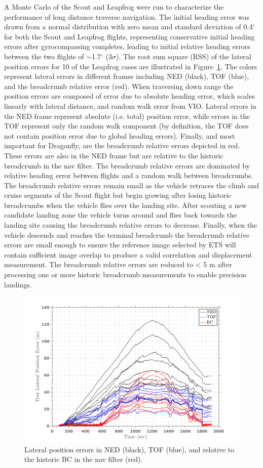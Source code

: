 A Monte Carlo of the Scout and Leapfrog were run to characterize the performance of long distance traverse navigation. The initial heading error was drawn from a normal distribution with zero mean and standard deviation of 0.4$^\circ$ for both the Scout and Leapfrog flights, representing conservative initial heading errors after gyrocompassing completes, leading to initial relative heading errors between the two flights of $\sim$1.7$^\circ$ (3$\sigma$). The root sum square (RSS) of the lateral position errors for 10 of the Leapfrog cases are illustrated in Figure~\ref{fig:leapfrog}. The colors represent lateral errors in different frames including NED (black), TOF (blue), and the breadcrumb relative error (red). When traversing down range the position errors are composed of error due to absolute heading error, which scales linearly with lateral distance, and random walk error from \ac{VIO}. Lateral errors in the NED frame represent absolute (i.e. total) position error, while errors in the TOF represent only the random walk component (by definition, the TOF does not contain position error due to global heading errors). Finally, and most important for Dragonfly, are the breadcrumb relative errors depicted in red. These errors are also in the NED frame but are relative to the historic breadcrumb in the nav filter. The breadcrumb relative errors are dominated by relative heading error between flights and a random walk between breadcrumbs. The breadcrumb relative errors remain small as the vehicle retraces the climb and cruise segments of the Scout flight but begin growing after losing historic breadcrumbs when the vehicle flies over the landing site. After scouting a new candidate landing zone the vehicle turns around and flies back towards the landing site causing the breadcrumb relative errors to decrease. Finally, when the vehicle descends and reaches the terminal breadcrumb the breadcrumb relative errors are small enough to ensure the reference image selected by ETS will contain sufficient image overlap to produce a valid correlation and displacement measurement. The breadcrumb relative errors are reduced to < 5 m after processing one or more historic breadcrumb measurements to enable precision landings.

\begin{figure}[htbp]
	\centering\includegraphics[width=5in]{content/figures/pos_err_all_frames.png}
	\caption{Lateral position errors in NED (black), TOF (blue), and relative to the historic BC in the nav filter (red).}
	\label{fig:leapfrog}
\end{figure}